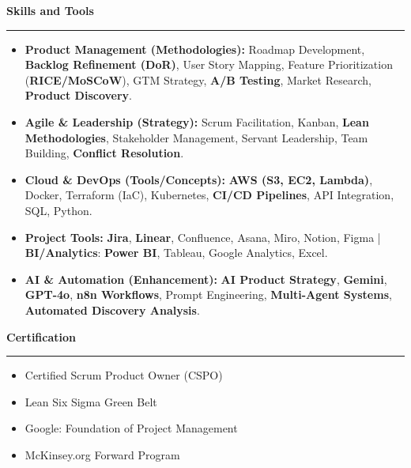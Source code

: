 \documentclass[9pt,letterpaper]{article} %
\newenvironment{rSection}[1]{ %
  \sectionskip
 \textbf{\Large #1} %
  \sectionlineskip
  \hrule %
  \begin{list}{}{ %
    \setlength{\leftmargin}{-0em} %
  }
  \item[]
}{
  \end{list}
}
\def\sectionlineskip{\smallskip} %
\def\sectionskip{} %
\begin{document}
\begin{rSection}{Skills and Tools}
\item[] \vspace{-0.5em}
\begin{itemize}[left=-1.5em, labelsep=.1cm, labelwidth=.2cm, itemsep=0.0em]
    \item \textbf{Product Management (Methodologies):} Roadmap Development, \textbf{Backlog Refinement (DoR)}, User Story Mapping, Feature Prioritization (\textbf{RICE/MoSCoW}), GTM Strategy, \textbf{A/B Testing}, Market Research, \textbf{Product Discovery}.
    \item \textbf{Agile \& Leadership (Strategy):} Scrum Facilitation, Kanban, \textbf{Lean Methodologies}, Stakeholder Management, Servant Leadership, Team Building, \textbf{Conflict Resolution}.
    \item \textbf{Cloud \& DevOps (Tools/Concepts):} \textbf{AWS (S3, EC2, Lambda)}, Docker, Terraform (IaC), Kubernetes, \textbf{CI/CD Pipelines}, API Integration, SQL, Python.
    \item \textbf{Project Tools:} \textbf{Jira}, \textbf{Linear}, Confluence, Asana, Miro, Notion, Figma | \textbf{BI/Analytics}: \textbf{Power BI}, Tableau, Google Analytics, Excel.
    \item \textbf{AI \& Automation (Enhancement):} \textbf{AI Product Strategy}, \textbf{Gemini}, \textbf{GPT-4o}, \textbf{n8n Workflows}, Prompt Engineering, \textbf{Multi-Agent Systems}, \textbf{Automated Discovery Analysis}.
\end{itemize}
\end{rSection}

\begin{rSection}{Certification}
\item[] \vspace{-1em}
\begin{itemize}[left=-1.5em, labelsep=.1cm, labelwidth=.2cm, itemsep=0.0em]
\item Certified Scrum Product Owner (CSPO)
\item Lean Six Sigma Green Belt
\item Google: Foundation of Project Management
\item McKinsey.org Forward Program
\end{itemize}
\end{rSection}
\end{document}
